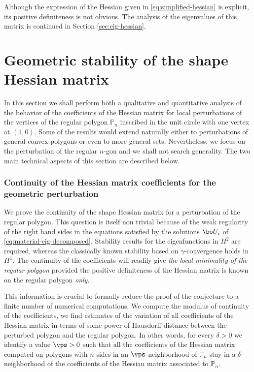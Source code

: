 Although the expression of the Hessian given in \eqref{eq:simplified-hessian} is explicit, its positive definiteness is not obvious. The analysis of the eigenvalues of this matrix is continued in Section \ref{sec:eig-hessian}.

\section{Geometric stability of the shape Hessian matrix}\label{bobus3}
In this section we shall perform both a qualitative and quantitative analysis of the behavior of the coefficients of the Hessian matrix for local perturbations of the vertices of the regular polygon $\mathbb P_n$ inscribed in the unit circle with one vertex at $(1,0)$. Some of the results would extend naturally either to perturbations of general convex polygons or even to more general sets. Nevertheless, we focus on the perturbation of the regular $n$-gon and we shall not search generality. The two main technical aspects of this section are described below.

\subsubsection*{Continuity of the Hessian matrix coefficients for the geometric perturbation}
We prove the continuity of the shape Hessian matrix for a perturbation of the regular polygon. This question is itself non trivial because of the weak regularity of the right hand sides in the equations satisfied by the solutions $\bo U_i$ of \eqref{eq:material-eig-decomposed}. Stability results for the eigenfunctions in $H^2$ are required, whereas the classically known stability based on $\gamma$-convergence holds in $H^1$. The continuity of the coefficients will readily give {\it the local minimality of the regular polygon} provided the positive definiteness of the Hessian matrix is known on the regular polygon {\it only}.

This information is crucial to formally reduce the proof of the conjecture to a finite number of numerical computations. We compute the modulus of continuity of the coefficients, \ie we find estimates of the variation of all coefficients of the Hessian matrix in terms of some power of Hausdorff distance between the perturbed polygon and the regular polygon. In other words, for every $\delta >0$ we identify a value $\vps >0$ such that all the coefficients of the Hessian matrix computed on polygons with $n$ sides in an $\vps$-neighborhood of $\mathbb P_n$ stay in a $\delta$-neighborhood of the coefficients of the Hessian matrix associated to $\mathbb P_n$.

